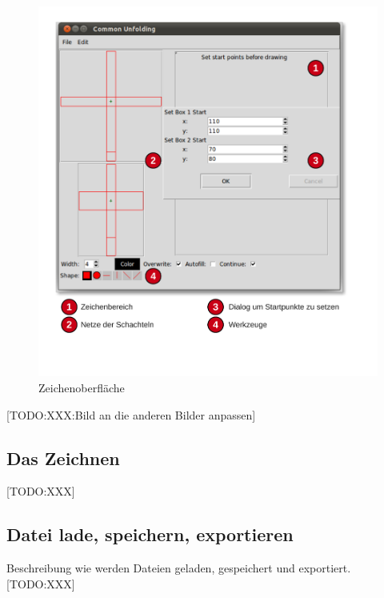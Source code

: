 \begin{figure}[htbp]
  \centering
  \includegraphics[scale=0.5]{03_pics/Zeichenbereich.pdf}
  \caption{Zeichenoberfläche}
  \label{fig:zeichenoberflaeche}
\end{figure}

[TODO:XXX:Bild an die anderen Bilder anpassen]


\subsection{Das Zeichnen}
[TODO:XXX]


\subsection{Datei lade, speichern, exportieren}
\label{subsec:dateioperationen}

Beschreibung wie werden Dateien geladen, gespeichert und exportiert.
[TODO:XXX]